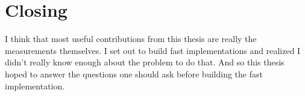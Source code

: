 \section{Closing}
I think that most useful contributions from this thesis are really the measurements themselves. I set out to build fast implementations and realized I didn't really
know enough about the problem to do that. And so this thesis hoped to answer the questions one should ask before building the fast implementation.
